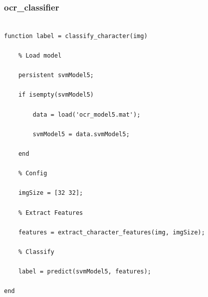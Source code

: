 \subsubsection{ocr\_classifier}

\begin{verbatim}

function label = classify_character(img)

    % Load model
    
    persistent svmModel5;
    
    if isempty(svmModel5)
    
        data = load('ocr_model5.mat');
    
        svmModel5 = data.svmModel5;
    
    end

    % Config 

    imgSize = [32 32];
    
    % Extract Features

    features = extract_character_features(img, imgSize);
    
    % Classify

    label = predict(svmModel5, features);
 
end
    
\end{verbatim}

